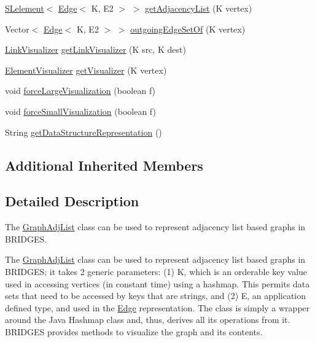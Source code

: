 \begin{DoxyCompactItemize}
\item 
\mbox{\hyperlink{classbridges_1_1base_1_1_s_lelement}{S\+Lelement}}$<$ \mbox{\hyperlink{classbridges_1_1base_1_1_edge}{Edge}}$<$ K, E2 $>$ $>$ \mbox{\hyperlink{classbridges_1_1base_1_1_graph_adj_list_aa8d25bc56b9a172999f0c62ee7e04b6f}{get\+Adjacency\+List}} (K vertex)
\item 
Vector$<$ \mbox{\hyperlink{classbridges_1_1base_1_1_edge}{Edge}}$<$ K, E2 $>$ $>$ \mbox{\hyperlink{classbridges_1_1base_1_1_graph_adj_list_a4bb687befb4a0f0d2f6923d0c567ebf2}{outgoing\+Edge\+Set\+Of}} (K vertex)
\item 
\mbox{\hyperlink{classbridges_1_1base_1_1_link_visualizer}{Link\+Visualizer}} \mbox{\hyperlink{classbridges_1_1base_1_1_graph_adj_list_af93888dbd2a768a2401619ad5dc95560}{get\+Link\+Visualizer}} (K src, K dest)
\item 
\mbox{\hyperlink{classbridges_1_1base_1_1_element_visualizer}{Element\+Visualizer}} \mbox{\hyperlink{classbridges_1_1base_1_1_graph_adj_list_aafb45833cd5c13b6ce9bdece3fefde6a}{get\+Visualizer}} (K vertex)
\item 
void \mbox{\hyperlink{classbridges_1_1base_1_1_graph_adj_list_a0e2dff032458bb03cb778b571ddcc9b6}{force\+Large\+Visualization}} (boolean f)
\item 
void \mbox{\hyperlink{classbridges_1_1base_1_1_graph_adj_list_ae14e51214742db0c4dab26c1d409f4ed}{force\+Small\+Visualization}} (boolean f)
\item 
String \mbox{\hyperlink{classbridges_1_1base_1_1_graph_adj_list_a9bba66056cdf24197c41fff455e19a6c}{get\+Data\+Structure\+Representation}} ()
\end{DoxyCompactItemize}
\subsection*{Additional Inherited Members}


\subsection{Detailed Description}
The \mbox{\hyperlink{classbridges_1_1base_1_1_graph_adj_list}{Graph\+Adj\+List}} class can be used to represent adjacency list based graphs in B\+R\+I\+D\+G\+ES. 

The \mbox{\hyperlink{classbridges_1_1base_1_1_graph_adj_list}{Graph\+Adj\+List}} class can be used to represent adjacency list based graphs in B\+R\+I\+D\+G\+ES; it takes 2 generic parameters\+: (1) K, which is an orderable key value used in accessing vertices (in constant time) using a hashmap. This permits data sets that need to be accessed by keys that are strings, and (2) E, an application defined type, and used in the \mbox{\hyperlink{classbridges_1_1base_1_1_edge}{Edge}} representation. The class is simply a wrapper around the Java Hashmap class and, thus, derives all its operations from it. B\+R\+I\+D\+G\+ES provides methods to visualize the graph and its contents.

